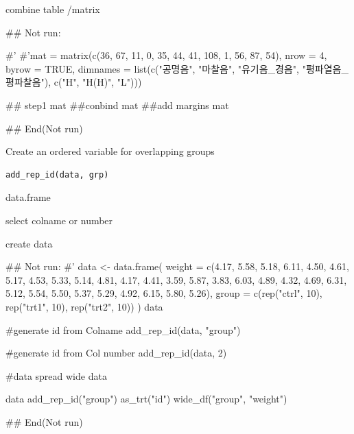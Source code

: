 \documentclass[a4paper]{book}
\begin{document}
%
\begin{Value}
combine table /matrix
\end{Value}
%
\begin{Examples}
\begin{ExampleCode}

\#\# Not run: 

#' #'mat = matrix(c(36, 67, 11,
          0, 35, 44,
         41, 108, 1,
          56, 87, 54),
           nrow = 4, byrow = TRUE,
   dimnames = list(c("공명음", "마찰음",
     "유기음_경음", "평파열음_평파찰음"),  c("H", "H(H)", "L")))

## step1
  mat %
##conbind
 mat %
##add margins
 mat %

## End(Not run)


\end{ExampleCode}
\end{Examples}
%
\begin{Description}
Create an ordered variable for overlapping groups
\end{Description}
%
\begin{Usage}
\begin{verbatim}
add_rep_id(data, grp)
\end{verbatim}
\end{Usage}
%
\begin{Arguments}
\begin{ldescription}
\item[\code{data}] data.frame

\item[\code{grp}] select colname or number
\end{ldescription}
\end{Arguments}
%
\begin{Value}
create data
\end{Value}
%
\begin{Examples}
\begin{ExampleCode}

\#\# Not run: 
#'
data <- data.frame(
  weight = c(4.17, 5.58, 5.18, 6.11, 4.50, 4.61, 5.17, 4.53, 5.33, 5.14,
             4.81, 4.17, 4.41, 3.59, 5.87, 3.83, 6.03, 4.89, 4.32, 4.69,
             6.31, 5.12, 5.54, 5.50, 5.37, 5.29, 4.92, 6.15, 5.80, 5.26),
  group = c(rep("ctrl", 10), rep("trt1", 10), rep("trt2", 10))
)
data

#generate id from Colname
add_rep_id(data, "group")

#generate id from Col number
add_rep_id(data, 2)

#data spread wide
data%


data%
  add_rep_id("group")%
  as_trt("id") %
  wide_df("group", "weight")


## End(Not run)


\end{ExampleCode}
\end{Examples}
\end{document}
